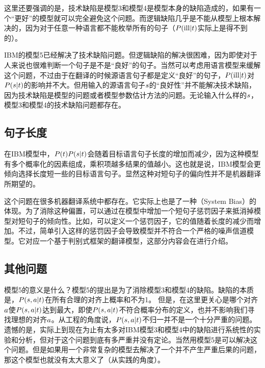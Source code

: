 \parinterval 这里还要强调的是，技术缺陷是模型3和模型4是模型本身的缺陷造成的，如果有一个“更好”的模型就可以完全避免这个问题。而逻辑缺陷几乎是不能从模型上根本解决的，因为对于任意一种语言都不能枚举所有的句子（${P}({\textrm{ill}|{t}})$实际上是得不到的）。

\parinterval IBM的模型5已经解决了技术缺陷问题。但逻辑缺陷的解决很困难，因为即使对于人来说也很难判断一个句子是不是“良好”的句子。当然可以考虑用语言模型来缓解这个问题，不过由于在翻译的时候源语言句子都是定义“良好”的句子，${P}({\textrm{ill}|{t}})$对${P}({s}| {t})$的影响并不大。但用输入的源语言句子${s}$的“良好性”并不能解决技术缺陷，因为技术缺陷是模型的问题或者模型参数估计方法的问题。无论输入什么样的${s}$，模型3和模型4的技术缺陷问题都存在。


\subsection{句子长度}

\parinterval 在IBM模型中，${P}({t}){P}({s}| {t})$会随着目标语言句子长度的增加而减少，因为这种模型有多个概率化的因素组成，乘积项越多结果的值越小。这也就是说，IBM模型会更倾向选择长度短一些的目标语言句子。显然这种对短句子的偏向性并不是机器翻译所期望的。

\parinterval 这个问题在很多机器翻译系统中都存在。它实际上也是了一种{\small{}}（System Bias）的体现。为了消除这种偏置，可以通过在模型中增加一个短句子惩罚因子来抵消掉模型对短句子的倾向性。比如，可以定义一个惩罚因子，它的值随着长度的减少而增加。不过，简单引入这样的惩罚因子会导致模型并不符合一个严格的噪声信道模型。它对应一个基于判别式框架的翻译模型，这部分内容会在{\chapterseven}进行介绍。


\subsection{其他问题}

\parinterval 模型5的意义是什么？模型5的提出是为了消除模型3和模型4的缺陷。缺陷的本质是，${P}({s},{a}| {t})$在所有合理的对齐上概率和不为1。 但是，在这里更关心是哪个对齐${a}$使${P}({s},{a}| {t})$达到最大，即使${P}({s},{a}|{t})$不符合概率分布的定义，也并不影响我们寻找理想的对齐${a}$。从工程的角度说，${P}({s},{a}| {t})$不归一并不是一个十分严重的问题。遗憾的是，实际上到现在为止有太多对IBM模型3和模型4中的缺陷进行系统性的实验和分析，但对于这个问题到底有多严重并没有定论。当然用模型5是可以解决这个问题。但是如果用一个非常复杂的模型去解决了一个并不产生严重后果的问题，那这个模型也就没有太大意义了（从实践的角度）。

